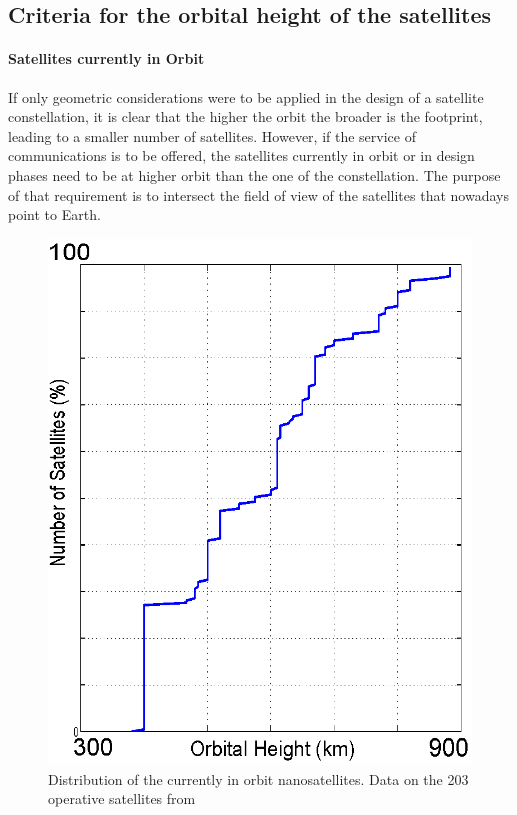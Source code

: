 \subsection{Criteria for the orbital height of the satellites}
\paragraph{Satellites currently in Orbit\\}
\begin{minipage}{0.45\textwidth}
If only geometric considerations were to be applied in the design of a satellite constellation, it is clear that the higher the orbit the broader is the footprint,  leading to a smaller number of satellites. However, if the service of communications is to be offered, the satellites currently in orbit or in design phases need to be at higher orbit than the one of the constellation. The purpose of that requirement is to intersect the field of view of the satellites that nowadays point to Earth.
\end{minipage}
\begin{minipage}{0.5\textwidth}

\begin{figure}[H]
\centering
	\includegraphics[scale=0.6]{CurrentOrbitDistribution3}
	\caption{Distribution of the currently in orbit nanosatellites. Data on the 203 operative satellites from \cite{nanosats}}	
\end{figure}
\end{minipage}
